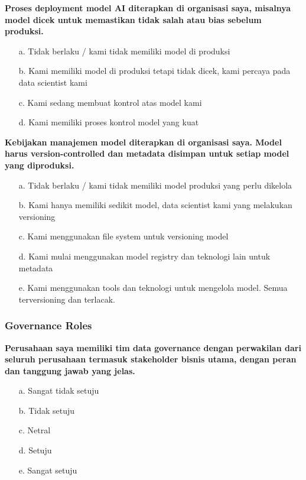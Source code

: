 \documentclass{article}
\begin{document}
\textbf{Proses deployment model AI diterapkan di organisasi saya, misalnya model dicek untuk memastikan tidak salah atau bias sebelum produksi.}

\begin{enumerate}
	\item[a.] Tidak berlaku / kami tidak memiliki model di produksi
	\item[b.] Kami memiliki model di produksi tetapi tidak dicek, kami percaya pada data scientist kami
	\item[c.] Kami sedang membuat kontrol atas model kami
	\item[d.] Kami memiliki proses kontrol model yang kuat
\end{enumerate}

\textbf{Kebijakan manajemen model diterapkan di organisasi saya. Model harus version-controlled dan metadata disimpan untuk setiap model yang diproduksi.}

\begin{enumerate}
	\item[a.] Tidak berlaku / kami tidak memiliki model produksi yang perlu dikelola
	\item[b.] Kami hanya memiliki sedikit model, data scientist kami yang melakukan versioning
	\item[c.] Kami menggunakan file system untuk versioning model
	\item[d.] Kami mulai menggunakan model registry dan teknologi lain untuk metadata
	\item[e.] Kami menggunakan tools dan teknologi untuk mengelola model. Semua terversioning dan terlacak.
\end{enumerate}

\subsubsection{Governance Roles}

\textbf{Perusahaan saya memiliki tim data governance dengan perwakilan dari seluruh perusahaan termasuk stakeholder bisnis utama, dengan peran dan tanggung jawab yang jelas.}

\begin{enumerate}
	\item[a.] Sangat tidak setuju
	\item[b.] Tidak setuju
	\item[c.] Netral
	\item[d.] Setuju
	\item[e.] Sangat setuju
\end{enumerate}
\end{document}

